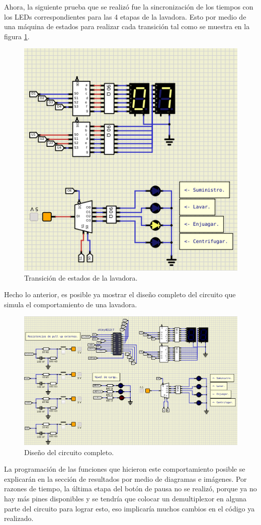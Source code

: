 Ahora, la siguiente prueba que se realizó fue la sincronización de los tiempos con los LEDs correspondientes para las 4 etapas de la lavadora. Esto por medio de una máquina de estados para realizar cada transición tal como se muestra en la figura \ref{fig15}.
\begin{figure}[H]
        \centering
        \includegraphics[width=.7\linewidth]{Imagenes/9.png}
        \caption{Transición de estados de la lavadora.}
        \label{fig15}
    \end{figure}
Hecho lo anterior, es posible ya mostrar el diseño completo del circuito que simula el comportamiento de una lavadora.
\begin{figure}[H]
        \centering
        \includegraphics[width=.7\linewidth]{Imagenes/10.png}
        \caption{Diseño del circuito completo.}
        \label{fig16}
    \end{figure}
La programación de las funciones que hicieron este comportamiento posible se explicarán en la sección de resultados por medio de diagramas e imágenes. Por razones de tiempo, la última etapa del botón de pausa no se realizó, porque ya no hay más pines disponibles y se tendría que colocar un demultiplexor en alguna parte del circuito para lograr esto, eso implicaría muchos cambios en el código ya realizado.

\newpage
